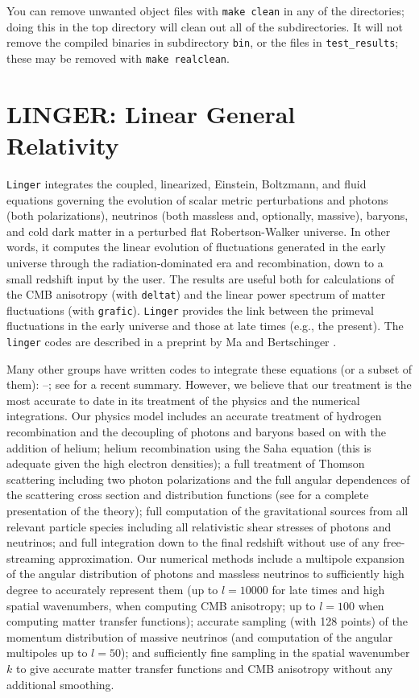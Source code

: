 You can remove unwanted object files with {\tt make clean} in any of
the directories; doing this in the top directory will clean out all
of the subdirectories.  It will not remove the compiled binaries in
subdirectory {\tt bin}, or the files in {\tt test\_results}; these may be
removed with {\tt make realclean}.

\section{LINGER: Linear General Relativity}

{\tt Linger} integrates the coupled, linearized, Einstein, Boltzmann, and fluid
equations governing the evolution of scalar metric perturbations and photons
(both polarizations), neutrinos (both massless and, optionally, massive),
baryons, and cold dark matter in a perturbed flat Robertson-Walker universe.
In other words, it computes the linear evolution of fluctuations generated
in the early universe through the radiation-dominated era and recombination,
down to a small redshift input by the user.  The results are useful both for
calculations of the CMB anisotropy (with {\tt deltat}) and the linear power
spectrum of matter fluctuations (with {\tt grafic}).  {\tt Linger} provides
the link between the primeval fluctuations in the early universe and those
at late times (e.g., the present).  The {\tt linger} codes are described
in a preprint by Ma and Bertschinger \cite{mab1}.

Many other groups have written codes to integrate these equations (or a subset
of them): \cite{py70}--\cite{st94}; see \cite{hu} for a recent summary.
However, we believe that our treatment is the most accurate to date in its
treatment of the physics and the numerical integrations.  Our physics model
includes an accurate treatment of hydrogen recombination and the decoupling
of photons and baryons based on \cite{p68} with the addition of helium; helium
recombination using the Saha equation (this is adequate given the high
electron densities); a full treatment of Thomson scattering including two
photon polarizations and the full angular dependences of the scattering
cross section and distribution functions (see \cite{k95} for a complete
presentation of the theory); full computation of the gravitational sources
from all relevant particle species including all relativistic shear stresses
of photons and neutrinos; and full integration down to the final redshift
without use of any free-streaming approximation.  Our numerical methods
include a multipole expansion of the angular distribution of photons and
massless neutrinos to sufficiently high degree to accurately represent them
(up to $l=10000$ for late times and high spatial wavenumbers, when computing
CMB anisotropy; up to $l=100$ when computing matter transfer functions);
accurate sampling (with 128 points) of the momentum distribution of massive
neutrinos (and computation of the angular multipoles up to $l=50$); and
sufficiently fine sampling in the spatial wavenumber $k$ to give accurate
matter transfer functions and CMB anisotropy without any additional smoothing.

